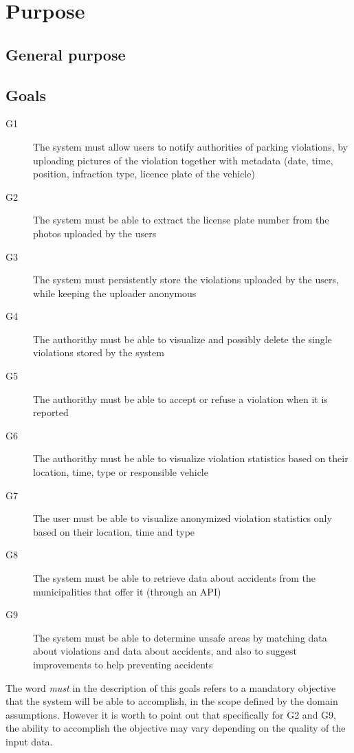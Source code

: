 \section{Purpose}

\subsection{General purpose}


\subsection{Goals}

\begin{description}
    \item[G1] The system must allow users to notify authorities of
    parking violations, by uploading pictures of the violation
    together with metadata
    (date, time, position, infraction type, licence plate of the vehicle)
    \item[G2] The system must be able to extract the license plate number
    from the photos uploaded by the users
    \item[G3] The system must persistently store the violations
    uploaded by the users, while keeping the uploader anonymous
    \item[G4] The authorithy must be able to visualize and possibly delete 
    the single violations stored by the system
    \item[G5] The authorithy must be able to accept or refuse a violation
    when it is reported 
    \item[G6] The authorithy must be able to visualize violation statistics
    based on their location, time, type or responsible vehicle
    \item[G7] The user must be able to visualize anonymized violation
    statistics only based on their location, time and type
    \item[G8] The system must be able to retrieve data about accidents
    from the municipalities that offer it (through an API)
    \item[G9] The system must be able to determine unsafe areas by
    matching data about violations and data about accidents, and also
    to suggest improvements to help preventing accidents      
\end{description}

\noindent
The word \emph{must} in the description of this goals refers to a mandatory
objective that the system will be able to accomplish, in the scope defined
by the domain assumptions.
However it is worth to point out that specifically for G2 and G9,
the ability to accomplish the objective may vary depending on the
quality of the input data.